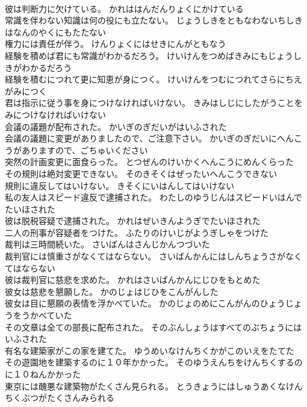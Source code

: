 \documentclass[8pt]{extreport}
\begin{document}
\begin{CJK}{UTF8}{min}
\\	彼は判断力に欠けている。	かれははんだんりょくにかけている 
\\	常識を伴わない知識は何の役にも立たない。	じょうしきをともなわないちしきはなんのやくにもたたない 
\\	権力には責任が伴う。	けんりょくにはせきにんがともなう 
\\	経験を積めば君にも常識がわかるだろう。	けいけんをつめばきみにもじょうしきがわかるだろう 
\\	経験を積むにつれて更に知恵が身につく。	けいけんをつむにつれてさらにちえがみにつく 
\\	君は指示に従う事を身につけなければいけない。	きみはしじにしたがうことをみにつけなければいけない 
\\	会議の議題が配布された。	かいぎのぎだいがはいふされた 
\\	会議の議題に変更がありましたので、ご注意下さい。	かいぎのぎだいにへんこうがありますので、ごちゅいください 
\\	突然の計画変更に面食らった。	とつぜんのけいかくへんこうにめんくらった 
\\	その規則は絶対変更できない。	そのきそくはぜったいへんこうできない 
\\	規則に違反してはいけない。	きそくにいはんしてはいけない 
\\	私の友人はスピード違反で逮捕された。	わたしのゆうじんはスピードいはんでたいほされた 
\\	彼は脱税容疑で逮捕された。	かれはぜいきんようぎでたいほされた 
\\	二人の刑事が容疑者をつけた。	ふたりのけいじがようぎしゃをつけた 
\\	裁判は三時間続いた。	さいばんはさんじかんつづいた 
\\	裁判官には慎重さがなくてはならない。	さいばんかんにはしんちょうさがなくてはならない 
\\	彼は裁判官に慈悲を求めた。	かれはさいばんかんにじひをもとめた 
\\	彼女は慈悲を懇願した。	かのじょはじひをこんがんした 
\\	彼女は目に懇願の表情を浮かべていた。	かのじょのめにこんがんのひょうじょうをうかべていた 
\\	その文章は全ての部長に配布された。	そのぶんしょうはすべてのぶちょうにはいふされた 
\\	有名な建築家がこの家を建てた。	ゆうめいなけんちくかがこのいえをたてた 
\\	その遊園地を建築するのに１０年かかった。	そのゆうえんちをけんちくするのに１０ねんかかった 
\\	東京には醜悪な建築物がたくさん見られる。	とうきょうにはしゅうあくなけんちくぶつがたくさんみられる 

\end{CJK}
\end{document}
